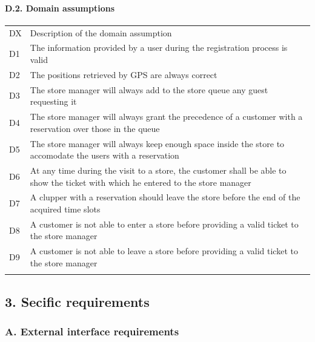 \documentclass[
]{article}
\begin{document}
\hypertarget{d.2.-domain-assumptions}{%
\paragraph{D.2. Domain assumptions}\label{d.2.-domain-assumptions}}

\begin{longtable}[]{@{}
  >{\raggedright\arraybackslash}p{}
  >{\raggedright\arraybackslash}p{}@{}}
\toprule
DX & Description of the domain assumption \\ \addlinespace
\midrule
\endhead
D1 & The information provided by a user during the registration process
is valid \\ \addlinespace
D2 & The positions retrieved by GPS are always correct \\ \addlinespace
D3 & The store manager will always add to the store queue any guest
requesting it \\ \addlinespace
D4 & The store manager will always grant the precedence of a customer
with a reservation over those in the queue \\ \addlinespace
D5 & The store manager will always keep enough space inside the store to
accomodate the users with a reservation \\ \addlinespace
D6 & At any time during the visit to a store, the customer shall be able
to show the ticket with which he entered to the store
manager \\ \addlinespace
D7 & A clupper with a reservation should leave the store before the end
of the acquired time slots \\ \addlinespace
D8 & A customer is not able to enter a store before providing a valid
ticket to the store manager \\ \addlinespace
D9 & A customer is not able to leave a store before providing a valid
ticket to the store manager \\ \addlinespace
\bottomrule
\end{longtable}

\hypertarget{secific-requirements}{%
\subsection{3. Secific requirements}\label{secific-requirements}}

\hypertarget{a.-external-interface-requirements}{%
\subsubsection{A. External interface
requirements}\label{a.-external-interface-requirements}}
\end{document}
